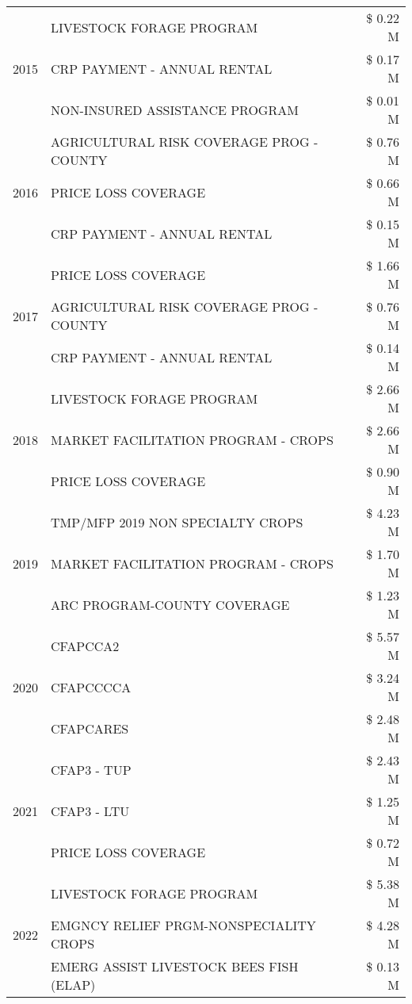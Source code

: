 \begin{tabular}{llr}
\multirow[t]{3}{*}{2015} & LIVESTOCK FORAGE PROGRAM & \$ 0.22 M \\
 & CRP PAYMENT - ANNUAL RENTAL & \$ 0.17 M \\
 & NON-INSURED ASSISTANCE PROGRAM & \$ 0.01 M \\
\cline{1-3}
\multirow[t]{3}{*}{2016} & AGRICULTURAL RISK COVERAGE PROG - COUNTY & \$ 0.76 M \\
 & PRICE LOSS COVERAGE & \$ 0.66 M \\
 & CRP PAYMENT - ANNUAL RENTAL & \$ 0.15 M \\
\cline{1-3}
\multirow[t]{3}{*}{2017} & PRICE LOSS COVERAGE & \$ 1.66 M \\
 & AGRICULTURAL RISK COVERAGE PROG - COUNTY & \$ 0.76 M \\
 & CRP PAYMENT - ANNUAL RENTAL & \$ 0.14 M \\
\cline{1-3}
\multirow[t]{3}{*}{2018} & LIVESTOCK FORAGE PROGRAM & \$ 2.66 M \\
 & MARKET FACILITATION PROGRAM - CROPS & \$ 2.66 M \\
 & PRICE LOSS COVERAGE & \$ 0.90 M \\
\cline{1-3}
\multirow[t]{3}{*}{2019} & TMP/MFP 2019 NON SPECIALTY CROPS & \$ 4.23 M \\
 & MARKET FACILITATION PROGRAM - CROPS & \$ 1.70 M \\
 & ARC PROGRAM-COUNTY COVERAGE & \$ 1.23 M \\
\cline{1-3}
\multirow[t]{3}{*}{2020} & CFAPCCA2 & \$ 5.57 M \\
 & CFAPCCCCA & \$ 3.24 M \\
 & CFAPCARES & \$ 2.48 M \\
\cline{1-3}
\multirow[t]{3}{*}{2021} & CFAP3 - TUP & \$ 2.43 M \\
 & CFAP3 - LTU & \$ 1.25 M \\
 & PRICE LOSS COVERAGE & \$ 0.72 M \\
\cline{1-3}
\multirow[t]{3}{*}{2022} & LIVESTOCK FORAGE PROGRAM & \$ 5.38 M \\
 & EMGNCY RELIEF PRGM-NONSPECIALITY CROPS & \$ 4.28 M \\
 & EMERG ASSIST LIVESTOCK BEES FISH (ELAP) & \$ 0.13 M \\
\cline{1-3}
\bottomrule
\end{tabular}

